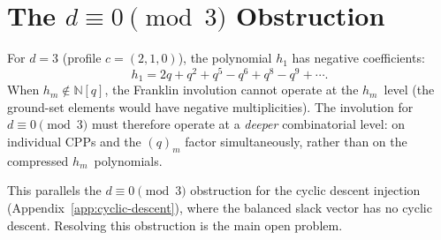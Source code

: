 \documentclass[11pt]{report}
\newcommand{\N}{\mathbb{N}}
\theoremstyle{plain}
\theoremstyle{definition}
\begin{document}


\chapter{The $d \equiv 0 \pmod{3}$ Obstruction}
\label{app:d-mod-3}

For $d = 3$ (profile $c = (2,1,0)$), the polynomial $h_1$
has negative coefficients:
\[
  h_1 = 2q + q^2 + q^5 - q^6 + q^8 - q^9 + \cdots.
\]
When $h_m \notin \N[q]$, the Franklin involution cannot
operate at the $h_m$~level (the ground-set elements would
have negative multiplicities).  The involution for
$d \equiv 0 \pmod{3}$ must therefore operate at a
\emph{deeper} combinatorial level: on individual CPPs
and the $(q)_m$ factor simultaneously, rather than on the
compressed $h_m$~polynomials.

This parallels the $d \equiv 0 \pmod{3}$ obstruction for
the cyclic descent injection (Appendix~\ref{app:cyclic-descent}),
where the balanced slack vector has no cyclic descent.
Resolving this obstruction is the main open problem.



\end{document}
